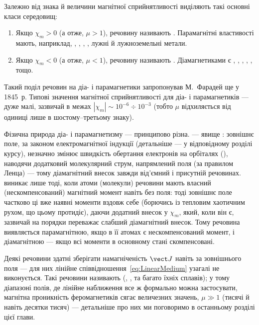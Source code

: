 Залежно від знака й величини магнітної сприйнятливості виділяють такі основні класи середовищ:
\begin{enumerate}
	\item Якщо $\chi_m > 0$ (а отже, $\mu>1$), речовину називають . Парамагнітні властивості мають, наприклад, ,
	      , , , лужні й лужноземельні метали.
	\item Якщо $\chi_m < 0$ (а отже, $\mu<1$), речовину називають . Діамагнетиками є , , , ,
	      ,  тощо.
\end{enumerate}
Такий поділ речовин на діа- і парамагнетики запропонував М.~Фарадей ще у 1845~р. Типові значення магнітної сприйнятливості для діа- і
парамагнетиків --- дуже малі, зазвичай в межах $|\chi_m| \sim 10^{-6} \div 10^{-3}$ (тобто $\mu$ відхиляється від одиниці лише в шостому--третьому
знаку).

\begin{Attention}
	Фізична природа діа- і парамагнетизму --- принципово різна.  --- явище : зовнішнє поле, за законом
	електромагнітної індукції (детальніше --- у відповідному розділі курсу), незначно змінює швидкість обертання електронів на орбіталях
	(), наводячи додатковий молекулярний струм, напрямлений  поля (за правилом Ленца) --- тому діамагнітний
	внесок завжди від'ємний і присутній  речовинах.  виникає лише тоді, коли атоми (молекули)
	речовини мають власний (нескомпенсований) магнітний момент навіть без поля: тоді зовнішнє поле частково  ці вже наявні моменти
	вздовж себе (борючись із тепловим хаотичним рухом, що цьому протидіє), даючи додатний внесок у $\chi_m$, який, коли він є, зазвичай на порядки
	переважає слабший діамагнітний внесок. Тому речовина виявляється парамагнітною, якщо в її атомах є нескомпенсований момент, і діамагнітною ---
	якщо всі моменти в основному стані скомпенсовані.
\end{Attention}

Деякі речовини здатні зберігати намагніченість $\vect J$ навіть за  зовнішнього поля --- для них лінійне
співвідношення~\eqref{eq:LinearMedium} узагалі не виконується. Такі речовини називають  (, ,  та
багато їхніх сплавів); у тому діапазоні полів, де лінійне наближення все ж формально можна застосувати, магнітна проникність феромагнетиків сягає
величезних значень, $\mu \gg 1$ (тисячі й навіть десятки тисяч) --- детальніше про них ми поговоримо в останньому розділі цієї глави.

